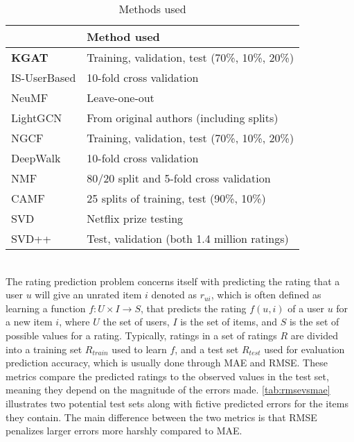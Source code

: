 \begin{table*}[]
    \begin{tabular}{|l|l|}
    \hline
    \textbf{}     & \textbf{Method used}                          \\ \hline
    \textbf{KGAT} & Training, validation, test (70\%, 10\%, 20\%) \\ \hline
    IS-UserBased  & 10-fold cross validation                      \\ \hline
    NeuMF         & Leave-one-out                                 \\ \hline
    LightGCN      & From original authors (including splits)      \\ \hline
    NGCF          & Training, validation, test (70\%, 10\%, 20\%) \\ \hline
    DeepWalk      & 10-fold cross validation                      \\ \hline
    NMF           & 80/20 split and 5-fold cross validation       \\ \hline
    CAMF          & 25 splits of training, test (90\%, 10\%)      \\ \hline
    SVD           & Netflix prize testing                         \\ \hline
    SVD++         & Test, validation (both 1.4 million ratings)   \\ \hline
    \end{tabular}
    \caption{Methods used}
    \label{tab:methodsused}
\end{table*}
\\
The rating prediction problem concerns itself with predicting the rating that a user $u$ will give an unrated item $i$ denoted as $r_{ui}$, which is often defined as learning a function $f : U \times I \rightarrow S$, that predicts the rating $f(u, i)$ of a user $u$ for a new item $i$, where $U$ the set of users, $I$ is the set of items, and $S$ is the set of possible values for a rating.
Typically, ratings in a set of ratings $R$ are divided into a training set $R_{train}$ used to learn $f$, and a test set $R_{test}$ used for evaluation prediction accuracy, which is usually done through MAE and RMSE.
These metrics compare the predicted ratings to the observed values in the test set, meaning they depend on the magnitude of the errors made.
\autoref{tab:rmsevsmae} illustrates two potential test sets along with fictive predicted errors for the items they contain.
The main difference between the two metrics is that RMSE penalizes larger errors more harshly compared to MAE.
